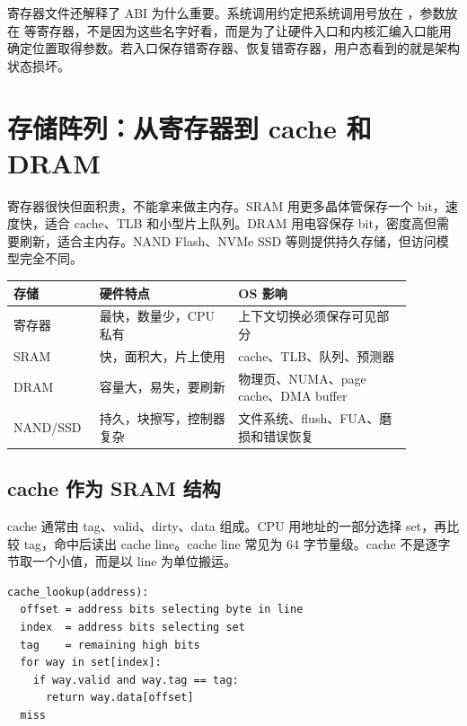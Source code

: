 寄存器文件还解释了 ABI 为什么重要。系统调用约定把系统调用号放在 ，参数放在  等寄存器，不是因为这些名字好看，而是为了让硬件入口和内核汇编入口能用确定位置取得参数。若入口保存错寄存器、恢复错寄存器，用户态看到的就是架构状态损坏。

\section{存储阵列：从寄存器到 cache 和 DRAM}

寄存器很快但面积贵，不能拿来做主内存。SRAM 用更多晶体管保存一个 bit，速度快，适合 cache、TLB 和小型片上队列。DRAM 用电容保存 bit，密度高但需要刷新，适合主内存。NAND Flash、NVMe SSD 等则提供持久存储，但访问模型完全不同。

\begin{longtable}{p{0.16\linewidth}p{0.32\linewidth}p{0.40\linewidth}}
\toprule
存储 & 硬件特点 & OS 影响 \\
\midrule
寄存器 & 最快，数量少，CPU 私有 & 上下文切换必须保存可见部分 \\
SRAM & 快，面积大，片上使用 & cache、TLB、队列、预测器 \\
DRAM & 容量大，易失，要刷新 & 物理页、NUMA、page cache、DMA buffer \\
NAND/SSD & 持久，块擦写，控制器复杂 & 文件系统、flush、FUA、磨损和错误恢复 \\
\bottomrule
\end{longtable}

\subsection{cache 作为 SRAM 结构}

cache 通常由 tag、valid、dirty、data 组成。CPU 用地址的一部分选择 set，再比较 tag，命中后读出 cache line。cache line 常见为 64 字节量级。cache 不是逐字节取一个小值，而是以 line 为单位搬运。

\begin{lstlisting}
cache_lookup(address):
  offset = address bits selecting byte in line
  index  = address bits selecting set
  tag    = remaining high bits
  for way in set[index]:
    if way.valid and way.tag == tag:
      return way.data[offset]
  miss
\end{lstlisting}

